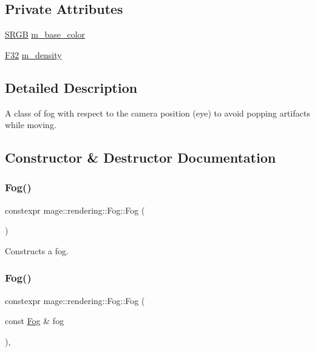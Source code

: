 \subsection*{Private Attributes}
\begin{DoxyCompactItemize}
\item 
\hyperlink{structmage_1_1_s_r_g_b}{S\+R\+GB} \hyperlink{classmage_1_1rendering_1_1_fog_af832a6c451bd2f3c9976f3f137a70c9d}{m\+\_\+base\+\_\+color}
\item 
\hyperlink{namespacemage_aa97e833b45f06d60a0a9c4fc22ae02c0}{F32} \hyperlink{classmage_1_1rendering_1_1_fog_aa7a402ad9eef0e9916bb9f83751ebe32}{m\+\_\+density}
\end{DoxyCompactItemize}


\subsection{Detailed Description}
A class of fog with respect to the camera position (eye) to avoid popping artifacts while moving. 

\subsection{Constructor \& Destructor Documentation}
\hypertarget{classmage_1_1rendering_1_1_fog_a48489b0ce940aff4395eb5ea88394081}{}\label{classmage_1_1rendering_1_1_fog_a48489b0ce940aff4395eb5ea88394081} 
\subsubsection{\texorpdfstring{Fog()}{Fog()}\hspace{0.1cm}{\footnotesize\ttfamily [1/3]}}
{\footnotesize\ttfamily constexpr mage\+::rendering\+::\+Fog\+::\+Fog (\begin{DoxyParamCaption}{ }\end{DoxyParamCaption})\hspace{0.3cm}{\ttfamily [noexcept]}}

Constructs a fog. \hypertarget{classmage_1_1rendering_1_1_fog_a2f730d70ed426468f113d44e7810394b}{}\label{classmage_1_1rendering_1_1_fog_a2f730d70ed426468f113d44e7810394b} 
\subsubsection{\texorpdfstring{Fog()}{Fog()}\hspace{0.1cm}{\footnotesize\ttfamily [2/3]}}
{\footnotesize\ttfamily constexpr mage\+::rendering\+::\+Fog\+::\+Fog (\begin{DoxyParamCaption}\item[{const \hyperlink{classmage_1_1rendering_1_1_fog}{Fog} \&}]{fog }\end{DoxyParamCaption})\hspace{0.3cm}{\ttfamily [default]}, {\ttfamily [noexcept]}}


